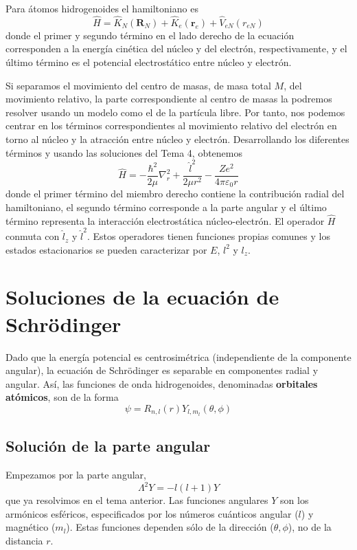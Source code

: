 \documentclass{tufte-handout}
\begin{document}
Para átomos hidrogenoides el hamiltoniano es
\begin{equation}
    \hat{H}=\hat{K}_N(\mathbf{R}_N) + \hat{K}_e(\mathbf{r}_e) + \hat{V}_{eN}(r_{eN})
\end{equation}
donde el primer y segundo término en el lado derecho de la ecuación 
corresponden a la energía cinética del núcleo y del electrón, 
respectivamente, y el último término es el potencial electrostático 
entre núcleo y electrón. 

Si separamos el movimiento del centro de masas, de masa total
$M$, del movimiento relativo, la parte correspondiente al centro
de masas la podremos resolver usando un modelo como el de la
partícula libre. Por tanto, nos podemos centrar en los términos 
correspondientes al movimiento relativo del electrón en torno
al núcleo y la atracción entre núcleo y electrón. Desarrollando 
los diferentes términos y usando las soluciones del Tema 4,
obtenemos
\begin{equation}
    \hat{H}=-\frac{\hbar^2}{2\mu}\nabla_r^2+ \frac{\hat{l}^2}{2\mu r^2} - \frac{Ze^2}{4\pi \varepsilon_0r}
\end{equation}
donde el primer término del miembro derecho
contiene la contribución radial del hamiltoniano, el segundo 
término corresponde a la parte angular y el último término
representa la interacción electrostática núcleo-electrón.
El operador $\hat{H}$ conmuta con $\hat{l}_z$ y $\hat{l}^2$. Estos
operadores tienen funciones propias comunes y los estados estacionarios
se pueden caracterizar por $E$, $l^2$ y $l_z$. 

\section{Soluciones de la ecuación de Schrödinger}
Dado que la energía potencial es centrosimétrica (independiente
de la componente angular), la ecuación de Schrödinger es separable
en componentes radial y angular. Así, las funciones de onda
hidrogenoides, denominadas \textbf{orbitales atómicos}, son de la forma
\begin{equation}
    \psi=R_{n,l}(r)Y_{l,m_l}(\theta,\phi)
\end{equation}


\subsection{Solución de la parte angular}
Empezamos por la parte angular, 
\begin{equation}
    \Lambda^2Y=-l(l+1)Y
\end{equation}
que ya resolvimos en el tema anterior. Las funciones angulares $Y$ 
son los armónicos esféricos, especificados por los números cuánticos
angular ($l$) y magnético ($m_l$). Estas funciones dependen sólo
de la dirección ($\theta,\phi$), no de la distancia $r$. 
\end{document}
